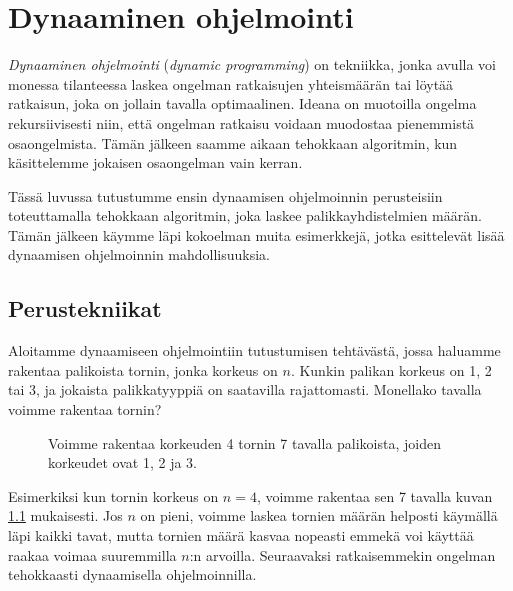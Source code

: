 \chapter{Dynaaminen ohjelmointi}


\emph{Dynaaminen ohjelmointi} (\emph{dynamic programming}) on tekniikka,
jonka avulla voi monessa tilanteessa
laskea ongelman ratkaisujen yhteismäärän tai
löytää ratkaisun, joka on jollain tavalla optimaalinen.
Ideana on muotoilla ongelma rekursiivisesti niin,
että ongelman ratkaisu voidaan muodostaa pienemmistä osaongelmista.
Tämän jälkeen saamme aikaan tehokkaan algoritmin,
kun käsittelemme jokaisen osaongelman vain kerran.

Tässä luvussa tutustumme ensin dynaamisen ohjelmoinnin perusteisiin
toteuttamalla tehokkaan algoritmin, joka laskee palikkayhdistelmien määrän.
Tämän jälkeen käymme läpi kokoelman muita esimerkkejä, jotka esittelevät
lisää dynaamisen ohjelmoinnin mahdollisuuksia.

\section{Perustekniikat}

Aloitamme dynaamiseen ohjelmointiin tutustumisen tehtävästä,
jossa haluamme rakentaa palikoista tornin, jonka korkeus on $n$.
Kunkin palikan korkeus on 1, 2 tai 3,
ja jokaista palikkatyyppiä on saatavilla rajattomasti.
Monellako tavalla voimme rakentaa tornin?

\begin{figure}
\center
{}
\caption{Voimme rakentaa korkeuden 4 tornin 7 tavalla palikoista,
joiden korkeudet ovat 1, 2 ja 3.}
\label{fig:dyntor}
\end{figure}

Esimerkiksi kun tornin korkeus on $n=4$, voimme rakentaa
sen 7 tavalla kuvan \ref{fig:dyntor} mukaisesti.
Jos $n$ on pieni, voimme laskea tornien määrän helposti
käymällä läpi kaikki tavat, mutta tornien määrä kasvaa
nopeasti emmekä voi käyttää raakaa voimaa suuremmilla
$n$:n arvoilla.
Seuraavaksi ratkaisemmekin ongelman tehokkaasti
dynaamisella ohjelmoinnilla.

